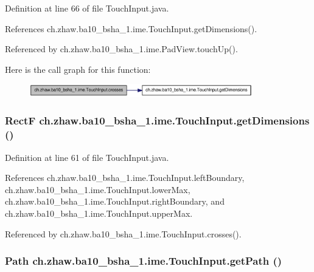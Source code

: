 Definition at line 66 of file TouchInput.java.

References ch.zhaw.ba10\_\-bsha\_\-1.ime.TouchInput.getDimensions().

Referenced by ch.zhaw.ba10\_\-bsha\_\-1.ime.PadView.touchUp().

Here is the call graph for this function:\nopagebreak
\begin{figure}[H]
\begin{center}
\leavevmode
\includegraphics[width=275pt]{classch_1_1zhaw_1_1ba10__bsha__1_1_1ime_1_1TouchInput_adb0a9fe73a2091ae7c3bdebe40be8a25_cgraph}
\end{center}
\end{figure}
\hypertarget{classch_1_1zhaw_1_1ba10__bsha__1_1_1ime_1_1TouchInput_ac68086768e724f1c1847b31dca3cc851}{
\subsubsection[{getDimensions}]{\setlength{\rightskip}{0pt plus 5cm}RectF ch.zhaw.ba10\_\-bsha\_\-1.ime.TouchInput.getDimensions ()}}
\label{classch_1_1zhaw_1_1ba10__bsha__1_1_1ime_1_1TouchInput_ac68086768e724f1c1847b31dca3cc851}


Definition at line 61 of file TouchInput.java.

References ch.zhaw.ba10\_\-bsha\_\-1.ime.TouchInput.leftBoundary, ch.zhaw.ba10\_\-bsha\_\-1.ime.TouchInput.lowerMax, ch.zhaw.ba10\_\-bsha\_\-1.ime.TouchInput.rightBoundary, and ch.zhaw.ba10\_\-bsha\_\-1.ime.TouchInput.upperMax.

Referenced by ch.zhaw.ba10\_\-bsha\_\-1.ime.TouchInput.crosses().\hypertarget{classch_1_1zhaw_1_1ba10__bsha__1_1_1ime_1_1TouchInput_a109b88f906f350c5d4c25abc5fd6f95e}{
\subsubsection[{getPath}]{\setlength{\rightskip}{0pt plus 5cm}Path ch.zhaw.ba10\_\-bsha\_\-1.ime.TouchInput.getPath ()}}
\label{classch_1_1zhaw_1_1ba10__bsha__1_1_1ime_1_1TouchInput_a109b88f906f350c5d4c25abc5fd6f95e}


